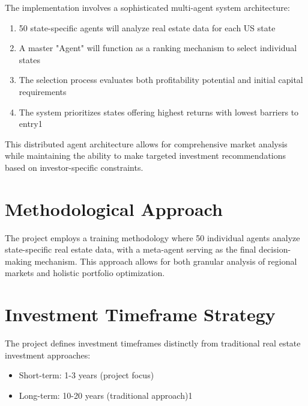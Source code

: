 The implementation involves a sophisticated multi-agent system architecture:


\begin{enumerate}

\item
50 state-specific agents will analyze real estate data for each US state




\item
A master "Agent" will function as a ranking mechanism to select individual states




\item
The selection process evaluates both profitability potential and initial capital requirements




\item
The system prioritizes states offering highest returns with lowest barriers to entry1




\end{enumerate}

This distributed agent architecture allows for comprehensive market analysis while maintaining the ability to make targeted investment recommendations based on investor-specific constraints.


\section*{Methodological Approach}

The project employs a training methodology where 50 individual agents analyze state-specific real estate data, with a meta-agent serving as the final decision-making mechanism. This approach allows for both granular analysis of regional markets and holistic portfolio optimization.


\section*{Investment Timeframe Strategy}

The project defines investment timeframes distinctly from traditional real estate investment approaches:


\begin{itemize}

\item
Short-term: 1-3 years (project focus)




\item
Long-term: 10-20 years (traditional approach)1




\end{itemize}

